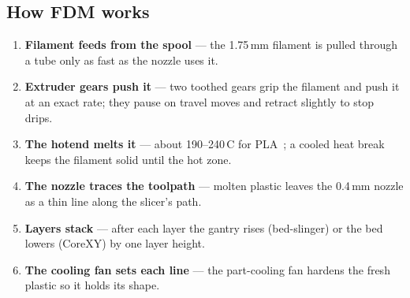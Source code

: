 \documentclass[11pt,a4paper]{report}
\newcommand{\degC}{\,\textdegree C}
\begin{document}
\subsection{How FDM works}
\begin{enumerate}[itemsep=1pt]
\item \textbf{Filament feeds from the spool} --- the 1.75\,mm filament is pulled through a tube only as fast as the nozzle uses it.
\item \textbf{Extruder gears push it} --- two toothed gears grip the filament and push it at an exact rate; they pause on travel moves and retract slightly to stop drips.
\item \textbf{The hotend melts it} --- about 190--240\degC{} for PLA~\cite{bambuwiki}; a cooled heat break keeps the filament solid until the hot zone.
\item \textbf{The nozzle traces the toolpath} --- molten plastic leaves the 0.4\,mm nozzle as a thin line along the slicer's path.
\item \textbf{Layers stack} --- after each layer the gantry rises (bed-slinger) or the bed lowers (CoreXY) by one layer height.
\item \textbf{The cooling fan sets each line} --- the part-cooling fan hardens the fresh plastic so it holds its shape.
\end{enumerate}
\end{document}
